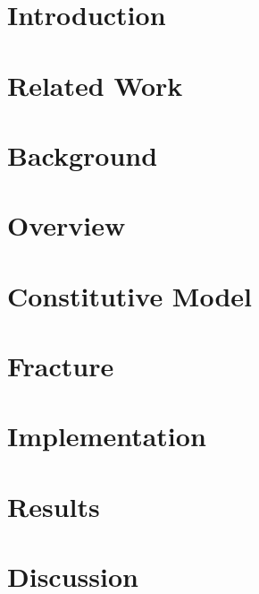 \section{Introduction}

\section{Related Work}

\section{Background}

\section{Overview}

\section{Constitutive Model}

\section{Fracture}

\section{Implementation}

\section{Results}

\section{Discussion}

%
%

%



